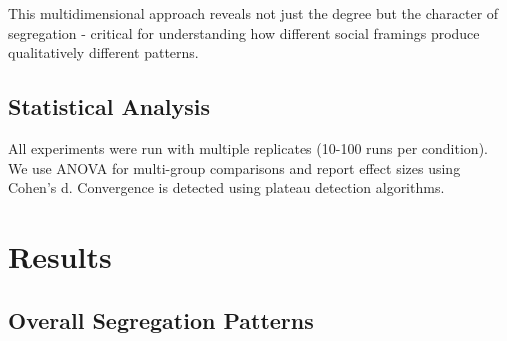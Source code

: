 \documentclass[pdflatex,sn-basic]{sn-jnl}%
\begin{document}
This multidimensional approach reveals not just the degree but the
character of segregation - critical for understanding how different
social framings produce qualitatively different patterns.

\subsection{Statistical Analysis}\label{statistical-analysis}

All experiments were run with multiple replicates (10-100 runs per
condition). We use ANOVA for multi-group comparisons and report effect
sizes using Cohen's d. Convergence is detected using plateau detection
algorithms.

\section{Results}\label{results}

\subsection{Overall Segregation
Patterns}\label{overall-segregation-patterns}

\end{document}
